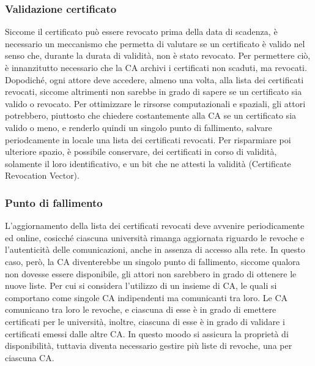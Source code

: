 \documentclass[a4paper,12pt]{article}
\begin{document}
\subsubsection{Validazione certificato} Siccome il certificato può essere revocato prima della data di scadenza, è necessario un meccanismo che permetta di valutare se un certificato è valido nel senso che, durante la durata di validità, non è stato revocato. Per permettere ciò, è innanzitutto necessario che la CA archivi i certificati non scaduti, ma revocati. Dopodiché, ogni attore deve accedere, almeno una volta, alla lista dei certificati revocati, siccome altrimenti non sarebbe in grado di sapere se un certificato sia valido o revocato. Per ottimizzare le rirsorse computazionali e spaziali, gli attori potrebbero, piuttosto che chiedere costantemente alla CA se un certificato sia valido o meno, e renderlo quindi un singolo punto di fallimento, salvare periodcamente in locale una lista dei certificati revocati. Per risparmiare poi ulteriore spazio, è possibile conservare, dei certificati in corso di validità, solamente il loro identificativo, e un bit che ne attesti la validità (Certificate Revocation Vector).
\subsubsection{Punto di fallimento} L'aggiornamento della lista dei certificati revocati deve avvenire periodicamente ed online, cosicché ciascuna università rimanga aggiornata riguardo le revoche e l'autenticità delle comunicazioni, anche in assenza di accesso alla rete.
\newline In questo caso, però, la CA diventerebbe un singolo punto di fallimento, siccome qualora non dovesse essere disponibile, gli attori non sarebbero in grado di ottenere le nuove liste. Per cui si considera l'utilizzo di un insieme di CA, le quali si comportano come singole CA indipendenti ma comunicanti tra loro. Le CA comunicano tra loro le revoche, e ciascuna di esse è in grado di emettere certificati per le università, inoltre, ciascuna di esse è in grado di validare i certificati emessi dalle altre CA. In questo moodo si assicura la proprietà di disponibilità, tuttavia diventa necessario gestire più liste di revoche, una per ciascuna CA.
\end{document}
